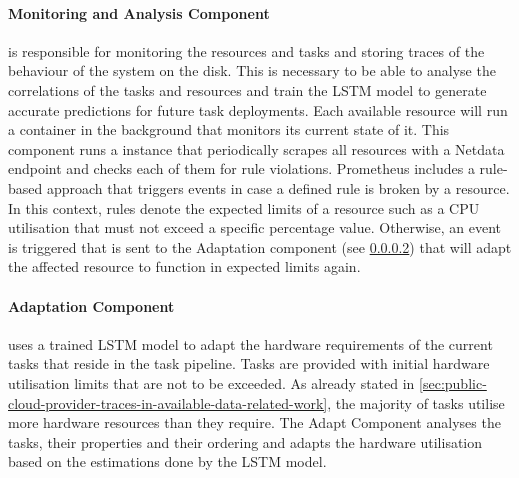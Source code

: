         \paragraph{Monitoring and Analysis Component}
        \label{par:monitoring-component-saa-background}
        
          is responsible for monitoring the resources and tasks and storing traces of the behaviour of the system on the disk.
          This is necessary to be able to analyse the correlations of the tasks and resources and train the LSTM model to generate accurate predictions for future task deployments. Each available resource will run a  container in the background that monitors its current state of it. 
          This component runs a  instance that periodically scrapes all resources with a Netdata endpoint and checks each of them for rule violations. Prometheus includes a rule-based approach that triggers events in case a defined rule is broken by a resource.
          In this context, rules denote the expected limits of a resource such as a CPU utilisation that must not exceed a specific percentage value.
          Otherwise, an event is triggered that is sent to the Adaptation component (see \ref{par:adapt-component-saa-background}) that will adapt the affected resource to function in expected limits again.
      
        
        \paragraph{Adaptation Component}
        \label{par:adapt-component-saa-background}
        
          uses a trained LSTM model to adapt the hardware requirements of the current tasks that reside in the task pipeline.
          Tasks are provided with initial hardware utilisation limits that are not to be exceeded. As already stated in \ref{sec:public-cloud-provider-traces-in-available-data-related-work}, the majority of tasks utilise more hardware resources than they require. The Adapt Component analyses the tasks, their properties and their ordering and adapts the hardware utilisation based on the estimations done by the LSTM model.


